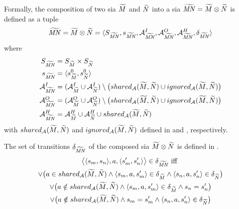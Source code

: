 \begin{definition}
    \label{def_sia_comp}
    Formally, the composition of two \gls{sia} $\widetilde{M}$ and $\widetilde{N}$ into a \gls{sia} $\widetilde{\mathit{MN}} = \widetilde{M} \otimes \widetilde{N}$ is defined as a tuple
    \begin{displaymath}
        \widetilde{\mathit{MN}} = \widetilde{M} \otimes \widetilde{N} = \langle S_{\widetilde{\mathit{MN}}}, s_{\widetilde{\mathit{MN}}}, \mathcal{A}_{\widetilde{\mathit{MN}}}^I, \mathcal{A}_{\widetilde{\mathit{MN}}}^O, \mathcal{A}_{\widetilde{\mathit{MN}}}^H, \delta_{\widetilde{\mathit{MN}}} \rangle
    \end{displaymath}
    where
    \begin{align}
        \nonumber
        S_{\widetilde{\mathit{MN}}} &= S_{\widetilde{M}} \times S_{\widetilde{N}} \\ \nonumber
        s_{\widetilde{\mathit{MN}}} &= \langle s_{\widetilde{M}}^0, s_{\widetilde{N}}^0 \rangle \\ \nonumber
        \mathcal{A}_{\widetilde{\mathit{MN}}}^I &= (\mathcal{A}_{\widetilde{M}}^I \cup \mathcal{A}_{\widetilde{N}}^I) \setminus \big (shared_\mathcal{A}(\widetilde{M},\widetilde{N}) \cup ignored_\mathcal{A}(\widetilde{M},\widetilde{N})\big ) \\ \nonumber
        \mathcal{A}_{\widetilde{\mathit{MN}}}^O &= (\mathcal{A}_{\widetilde{M}}^O \cup \mathcal{A}_{\widetilde{N}}^O) \setminus \big (shared_\mathcal{A}(\widetilde{M},\widetilde{N}) \cup ignored_\mathcal{A}(\widetilde{M},\widetilde{N})\big ) \\ \nonumber
        \mathcal{A}_{\widetilde{\mathit{MN}}}^H &= \mathcal{A}_{\widetilde{M}}^H \cup \mathcal{A}_{\widetilde{N}}^H \cup shared_\mathcal{A}(\widetilde{M},\widetilde{N})
    \end{align}
    with $shared_{\mathcal{A}}(\widetilde{M}, \widetilde{N})$ and $ignored_{\mathcal{A}}(\widetilde{M}, \widetilde{N})$ defined in \Equ{\ref{eq_shared_actions}} and \Equ{\ref{eq_ignored_actions}}, respectively.

    The set of transitions $\delta_{\widetilde{\mathit{MN}}}$ of the composed \gls{sia} $\widetilde{M} \otimes {\widetilde{N}}$ is defined in \Equ{\ref{eq.sia.fold}}.
    \begin{multline}
        \label{eq.sia.fold}
        \big \langle \langle s_m, s_n \rangle, a, \langle s_m', s_n' \rangle \big \rangle \in \delta_{\widetilde{\mathit{MN}}} \mbox{ iff } \\
        \lor \big (a \in shared_\mathcal{A}(\widetilde{M},\widetilde{N}) \land \langle s_m, a, s_m' \rangle \in \delta_{\widetilde{M}} \land \langle s_n, a, s_n' \rangle \in \delta_{\widetilde{N}} \big ) \\
        \lor \big (a \notin shared_\mathcal{A}(\widetilde{M},\widetilde{N}) \land \langle s_m, a, s_m' \rangle \in \delta_{\widetilde{M}} \land s_n = s_n' \big ) \\
        \lor \big (a \notin shared_\mathcal{A}(\widetilde{M},\widetilde{N}) \land s_m = s_m' \land \langle s_n, a, s_n' \rangle \in \delta_{\widetilde{N}} \big )
    \end{multline}
\end{definition}

